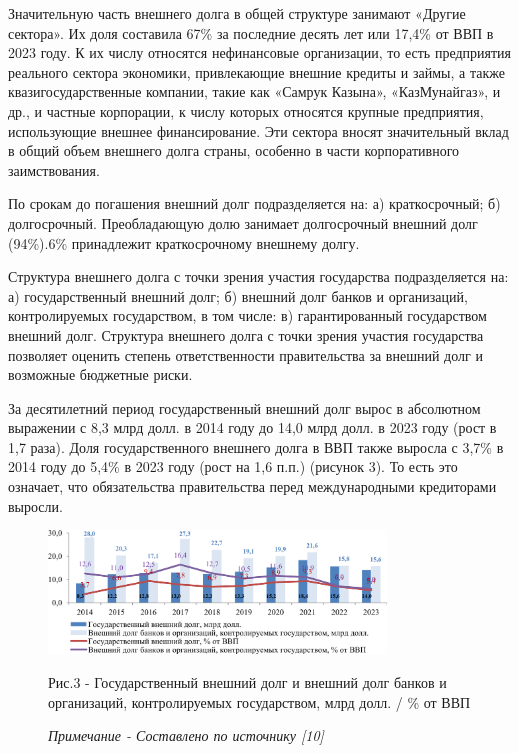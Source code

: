 \begin{multicols}{2}
Значительную часть внешнего долга в общей структуре занимают «Другие
сектора». Их доля составила 67\% за последние десять лет или 17,4\% от
ВВП в 2023 году. К их числу относятся нефинансовые организации, то есть
предприятия реального сектора экономики, привлекающие внешние кредиты и
займы, а также квазигосударственные компании, такие как «Самрук Казына»,
«КазМунайгаз», и др., и частные корпорации, к числу которых относятся
крупные предприятия, использующие внешнее финансирование. Эти сектора
вносят значительный вклад в общий объем внешнего долга страны, особенно
в части корпоративного заимствования.

По срокам до погашения внешний долг подразделяется на: а) краткосрочный;
б) долгосрочный. Преобладающую долю занимает долгосрочный внешний долг
(94\%).6\% принадлежит краткосрочному внешнему долгу.

Структура внешнего долга с точки зрения участия государства
подразделяется на: а) государственный внешний долг; б) внешний долг
банков и организаций, контролируемых государством, в том числе: в)
гарантированный государством внешний долг. Структура внешнего долга с
точки зрения участия государства позволяет оценить степень
ответственности правительства за внешний долг и возможные бюджетные
риски.

За десятилетний период государственный внешний долг вырос в абсолютном
выражении с 8,3 млрд долл. в 2014 году до 14,0 млрд долл. в 2023 году
(рост в 1,7 раза). Доля государственного внешнего долга в ВВП также
выросла с 3,7\% в 2014 году до 5,4\% в 2023 году (рост на 1,6 п.п.)
(рисунок 3). То есть это означает, что обязательства правительства перед
международными кредиторами выросли.
\end{multicols}

\begin{figure}[H]
	\centering
	\includegraphics[width=0.8\textwidth]{media/ekon4/image14}
	\caption*{Рис.3 - Государственный внешний долг и внешний долг банков и организаций, контролируемых государством, млрд долл. / \% от ВВП}
	\caption*{\normalfont\emph{Примечание - Составлено по источнику {[}10{]}}}
\end{figure}

